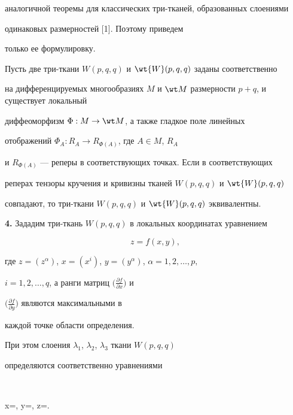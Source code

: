 аналогичной теоремы для классических три-тканей, образованных слоениями


одинаковых размерностей [1]. Поэтому приведем


только ее формулировку.








\begin{thm}


Пусть две три-ткани $W(p,q,q)$ и $\wt{W}(p,q,q)$ заданы соответственно


на дифференцируемых многообразиях $M$ и $\wt M$ размерности $p+q$, и существует локальный


диффеоморфизм $\Phi: M \rightarrow \wt M$, а также гладкое поле линейных


отображений $\Phi_{A}: R_{A} \rightarrow R_{\Phi(A)}$, где $A \in M$, $R_{A}$


и $R_{\Phi(A)}$ --- реперы в соответствующих точках. Если в соответствующих


реперах тензоры кручения и кривизны тканей $W(p,q,q)$ и $\wt{W}(p,q,q)$


совпадают, то три-ткани $W(p,q,q)$ и $\wt{W}(p,q,q)$ эквивалентны.


\end{thm}








{\bf 4.} Зададим три-ткань $W(p,q,q)$ в локальных координатах уравнением


\begin{equation}


z=f(x,y),


\end{equation}


где $z=(z^{\alpha})$, $x=(x^i)$, $y =(y^{\alpha})$, $\alpha=1,2, \dotsc, p,$


$i=1,2, \dotsc,q$, а ранги матриц $\big(\frac{\partial f}{\partial x}\big)$ и


$\big(\frac{\partial f}{\partial y}\big)$ являются максимальными в


каждой точке области определения.


При этом слоения $\lambda_{1}$, $\lambda_{2}$, $\lambda_{3}$ ткани $W(p,q,q)$


определяются соответственно уравнениями


$$


x=\const, \quad y=\const, \quad z=\const.


